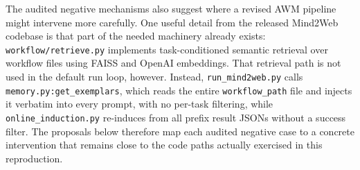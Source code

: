 \documentclass{article}
\begin{document}
The audited negative mechanisms also suggest where a revised AWM
pipeline might intervene more carefully. One useful detail from the
released Mind2Web codebase is that part of the needed machinery already
exists: \texttt{workflow/retrieve.py} implements task-conditioned
semantic retrieval over workflow files using FAISS and OpenAI
embeddings. That retrieval path is not used in the default run loop,
however. Instead, \texttt{run\_mind2web.py} calls
\texttt{memory.py:get\_exemplars}, which reads the entire
\texttt{workflow\_path} file and injects it verbatim into every prompt,
with no per-task filtering, while \texttt{online\_induction.py}
re-induces from all prefix result JSONs without a success filter. The
proposals below therefore map each audited negative case to a concrete
intervention that remains close to the code paths actually exercised in
this reproduction.
\end{document}
